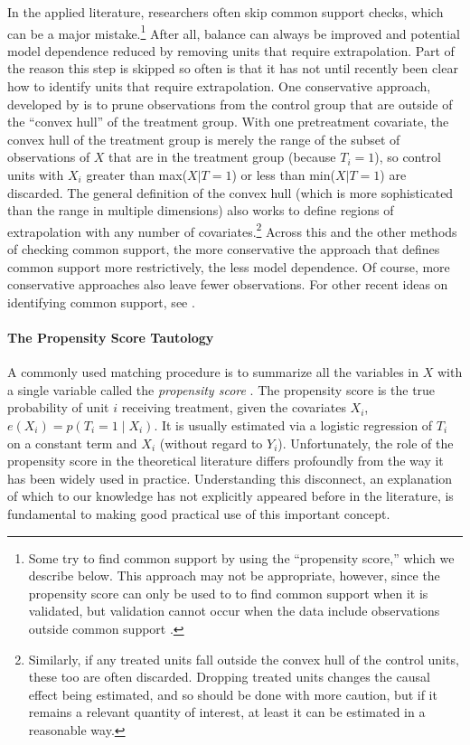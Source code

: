 \documentclass[11pt,titlepage]{article}
\begin{document}
In the applied literature, researchers often skip common support
checks, which can be a major mistake.\footnote{Some try to find common
  support by using the ``propensity score,'' which we describe below.
  This approach may not be appropriate, however, since the propensity
  score can only be used to to find common support when it is
  validated, but validation cannot occur when the data include
  observations outside common support \citep[see][and the discussion
  below]{KinZen06b}.}  After all, balance can always be improved and
potential model dependence reduced by removing units that require
extrapolation.  Part of the reason this step is skipped so often is
that it has not until recently been clear how to identify units that
require extrapolation.  One conservative approach, developed by
\citet{KinZen06b} is to prune observations from the control group that
are outside of the ``convex hull'' of the treatment group.  With one
pretreatment covariate, the convex hull of the treatment group is
merely the range of the subset of observations of $X$ that are in the
treatment group (because $T_i=1$), so control units with $X_i$ greater
than max($X|T=1$) or less than min($X|T=1$) are discarded.  The
general definition of the convex hull (which is more sophisticated
than the range in multiple dimensions) also works to define regions of
extrapolation with any number of covariates.\footnote{Similarly, if
  any treated units fall outside the convex hull of the control units,
  these too are often discarded.  Dropping treated units changes the
  causal effect being estimated, and so should be done with more
  caution, but if it remains a relevant quantity of interest, at least
  it can be estimated in a reasonable way.}  Across this and the other
methods of checking common support, the more conservative the approach
that defines common support more restrictively, the less model
dependence.  Of course, more conservative approaches also leave fewer
observations.  For other recent ideas on identifying common support,
see \citet{IacPor06}.

\paragraph{The Propensity Score Tautology}
A commonly used matching procedure is to summarize all the variables
in $X$ with a single variable called the \emph{propensity score}
\citep{RosRub83}.  The propensity score is the true probability of
unit $i$ receiving treatment, given the covariates $X_i$, $e(X_i) =
p(T_i=1 \mid X_i)$.  It is usually estimated via a logistic regression
of $T_i$ on a constant term and $X_i$ (without regard to $Y_i$).
Unfortunately, the role of the propensity score in the theoretical
literature differs profoundly from the way it has been widely used in
practice.  Understanding this disconnect, an explanation of which to
our knowledge has not explicitly appeared before in the literature, is
fundamental to making good practical use of this important concept.
\end{document}
